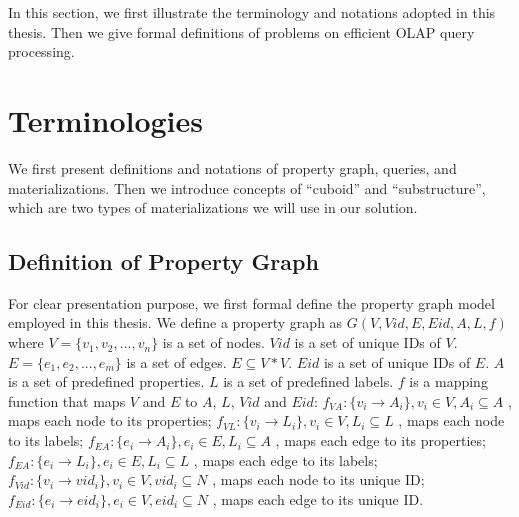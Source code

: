 In this section, we first illustrate the terminology and notations adopted in this thesis. Then we give formal definitions of problems on efficient OLAP query processing.


\section{Terminologies}

We first present definitions and notations of property graph, queries, and materializations. Then we introduce concepts of ``cuboid'' and ``substructure'', which are two types of materializations we will use in our solution. 

\subsection{Definition of Property Graph}
For clear presentation purpose, we first formal define the property graph model employed in this thesis. We define a property graph as $G(V, Vid, E, Eid, A, L, f)$ where  $V=\{v_{1}, v_{2},...,v_{n}\}$ is a set of nodes. $Vid$ is a set of unique IDs of $V$. $E=\{e_{1}, e_{2},...,e_{m}\}$ is a set of edges. $E \subseteq V * V$. $Eid$ is a set of unique IDs of $E$. $A$ is a set of predefined properties. $L$ is a set of predefined labels. $f$ is a mapping function that maps $V$ and $E$ to $A$, $L$, $Vid$ and $Eid$: $f_{VA}: \{v_{i} \rightarrow A_{i}\}, v_{i}\in V, A_{i} \subseteq A$ , maps each node to its properties; $f_{VL}: \{v_{i} \rightarrow L_{i}\}, v_{i}\in V, L_{i} \subseteq L$ , maps each node to its labels; $f_{EA}: \{e_{i} \rightarrow A_{i}\}, e_{i}\in E, L_{i} \subseteq A$ , maps each edge to its properties; $f_{EA}: \{e_{i} \rightarrow L_{i}\}, e_{i}\in E, L_{i} \subseteq L$ , maps each edge to its labels; $f_{Vid}: \{v_{i} \rightarrow vid_{i}\}, v_{i}\in V, vid_{i} \subseteq N$ , maps each node to its unique ID; $f_{Eid}: \{e_{i} \rightarrow eid_{i}\}, e_{i}\in V, eid_{i} \subseteq N$ , maps each edge to its unique ID.

